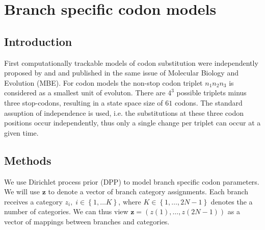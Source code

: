 \chapter{Branch specific codon models}

\section{Introduction}

First computationally trackable models of codon substitution were independently proposed by \cite{Muse1994} and \cite{Goldman1994} and published in the same issue of Molecular Biology and Evolution (MBE).
For codon models the non-stop codon triplet $n_{1}n_{2}n_{3}$ is considered as a smallest unit of evoluton.
There are $4^3$ possible triplets minus three stop-codons, resulting in a state space size of $61$ codons.
The standard assuption of independence is used, i.e. the substitutions at these three codon positions occur independently, thus only a single change per triplet can occur at a given time.





































\section{Methods}
We use Dirichlet process prior (DPP) to model branch specific codon parameters.
We will use $\mathbf{z}$ to denote a vector of branch category assignments.
Each branch receives a category $z_{i},\; i\in\left\{ 1,\ldots K\right\}$, where $K\in\left\{ 1,\ldots,2N-1\right\}$ denotes the a number of categories.
We can thus view $\mathbf{z}=\left(z(1),\ldots,z(2N-1)\right)$ as a vector of mappings between branches and categories.
 
